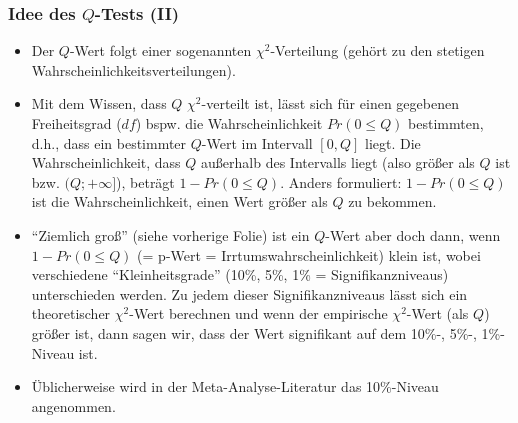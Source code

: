 \begin{frame}[plain]
  \frametitle{Idee des $Q$-Tests (II)}
  \begin{small}
    \begin{itemize}
    \item Der $Q$-Wert folgt einer sogenannten $\chi^2$-Verteilung (gehört zu den stetigen
      Wahrscheinlichkeitsverteilungen).
    \item Mit dem Wissen, dass $Q$ $\chi^2$-verteilt ist, lässt sich für einen gegebenen Freiheitsgrad ($df$) bspw. die
      Wahrscheinlichkeit $Pr(0 \leq Q)$ bestimmten, d.h., dass ein bestimmter $Q$-Wert im Intervall $[0, Q]$ liegt. Die
      Wahrscheinlichkeit, dass $Q$ außerhalb des Intervalls liegt (also größer als $Q$ ist bzw. $(Q; +\infty]$), beträgt
      $1-Pr(0 \leq Q)$. Anders formuliert: $1-Pr(0 \leq Q)$ ist die Wahrscheinlichkeit, einen Wert größer als $Q$ zu bekommen.
    \item "`Ziemlich groß"' (siehe vorherige Folie) ist ein $Q$-Wert aber doch dann, wenn $1-Pr(0 \leq Q)$ (= p-Wert =
      Irrtumswahrscheinlichkeit) klein ist, wobei
      verschiedene "`Kleinheitsgrade"' (10\%, 5\%, 1\% = Signifikanzniveaus) unterschieden werden. Zu jedem dieser
      Signifikanzniveaus lässt sich ein theoretischer $\chi^2$-Wert berechnen und wenn der empirische $\chi^2$-Wert (als
      $Q$) größer ist, dann sagen wir, dass der Wert signifikant auf dem 10\%-, 5\%-, 1\%-Niveau ist.
    \item Üblicherweise wird in der Meta-Analyse-Literatur das 10\%-Niveau angenommen.
    \end{itemize}
  \end{small}
\end{frame}


